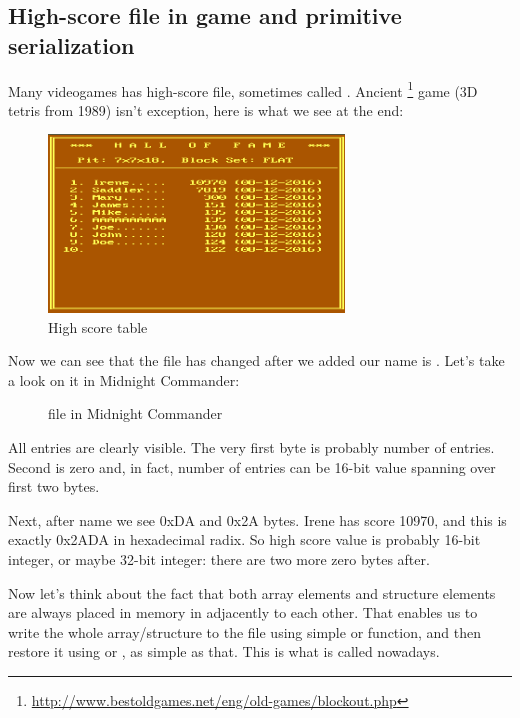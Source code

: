 \subsection{High-score file in  game and primitive serialization}

Many videogames has high-score file, sometimes called .
Ancient \footnote{\url{http://www.bestoldgames.net/eng/old-games/blockout.php}} game
(3D tetris from 1989) isn't exception, here is what we see at the end:

\begin{figure}[H]
\centering
\includegraphics[width=0.7\textwidth]{advanced/550_more_structs/blockout/hs.png}
\caption{High score table}
\end{figure}

Now we can see that the file has changed after we added our name is .
Let's take a look on it in Midnight Commander:

\begin{figure}[H]
\centering
{}
\caption{ file in Midnight Commander}
\end{figure}

All entries are clearly visible.
The very first byte is probably number of entries.
Second is zero and, in fact, number of entries can be 16-bit value spanning over first two bytes.

Next, after  name we see 0xDA and 0x2A bytes.
Irene has score 10970, and this is exactly 0x2ADA in hexadecimal radix.
So high score value is probably 16-bit integer, or maybe 32-bit integer: there are two more zero bytes after.

Now let's think about the fact that both array elements and structure elements are always placed in memory in adjacently to each other.
That enables us to write the whole array/structure to the file using simple  or  function, 
and then restore it using  or , as simple as that.
This is what is called  nowadays.

